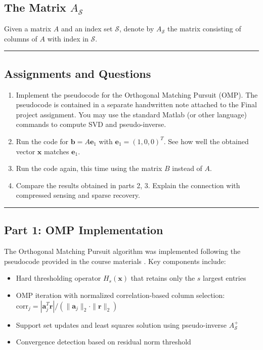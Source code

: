 \subsection*{The Matrix $A_\mathcal{S}$}

Given a matrix $A$ and an index set $\mathcal{S}$, denote by $A_\mathcal{S}$ the matrix consisting of columns of $A$ with index in $\mathcal{S}$.

\noindent\rule{\textwidth}{0.4pt}

\vspace{1em}

\subsection*{Assignments and Questions}

\begin{enumerate}
\item Implement the pseudocode for the Orthogonal Matching Pursuit (OMP). The pseudocode is contained in a separate handwritten note attached to the Final project assignment. You may use the standard Matlab (or other language) commands to compute SVD and pseudo-inverse.

\item Run the code for $\mathbf{b} = A\mathbf{e}_1$ with $\mathbf{e}_1 = (1, 0, 0)^T$. See how well the obtained vector $\mathbf{x}$ matches $\mathbf{e}_1$.

\item Run the code again, this time using the matrix $B$ instead of $A$.

\item Compare the results obtained in parts 2, 3. Explain the connection with compressed sensing and sparse recovery.
\end{enumerate}

\vspace{1em}

\noindent\rule{\textwidth}{0.4pt}

\clearpage
\subsection*{Part 1: OMP Implementation}

The Orthogonal Matching Pursuit algorithm was implemented following the pseudocode provided in the course materials \cite{panchenko_448_notes}. Key components include:

\begin{itemize}
    \item Hard thresholding operator $H_s(\mathbf{x})$ that retains only the $s$ largest entries
    \item OMP iteration with normalized correlation-based column selection: $\text{corr}_j = |\mathbf{a}_j^T \mathbf{r}| / (\|\mathbf{a}_j\|_2 \cdot \|\mathbf{r}\|_2)$
    \item Support set updates and least squares solution using pseudo-inverse $A_\mathcal{S}^+$
    \item Convergence detection based on residual norm threshold
\end{itemize}

